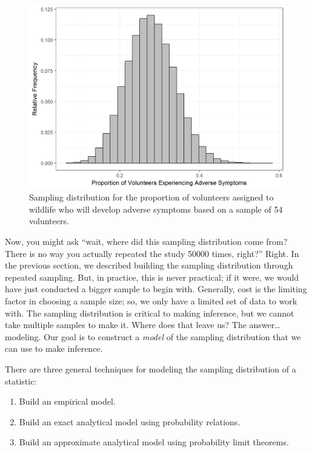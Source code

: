 \documentclass[]{book}
\providecommand{\tightlist}{%
  \setlength{\itemsep}{0pt}\setlength{\parskip}{0pt}}
\theoremstyle{plain}
\theoremstyle{mydefn}
\theoremstyle{myexmpl}
\theoremstyle{remark}
\begin{document}
\begin{figure}

{\centering \includegraphics[width=0.8\linewidth]{./Images/samplingdistns-deepwater-histogram-1} 

}

\caption{Sampling distribution for the proportion of volunteers assigned to wildlife who will develop adverse symptoms based on a sample of 54 volunteers.}\label{fig:samplingdistns-deepwater-histogram}
\end{figure}

Now, you might ask ``wait, where did this sampling distribution come
from? There is no way you actually repeated the study 50000 times,
right?'' Right. In the previous section, we described building the
sampling distribution through repeated sampling. But, in practice, this
is never practical; if it were, we would have just conducted a bigger
sample to begin with. Generally, cost is the limiting factor in choosing
a sample size; so, we only have a limited set of data to work with. The
sampling distribution is critical to making inference, but we cannot
take multiple samples to make it. Where does that leave us? The
answer\ldots{}modeling. Our goal is to construct a \emph{model} of the
sampling distribution that we can use to make inference.

There are three general techniques for modeling the sampling
distribution of a statistic:

\begin{enumerate}
\def\labelenumi{\arabic{enumi}.}
\tightlist
\item
  Build an empirical model.
\item
  Build an exact analytical model using probability relations.
\item
  Build an approximate analytical model using probability limit
  theorems.
\end{enumerate}
\end{document}
